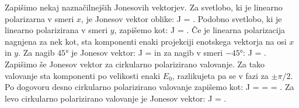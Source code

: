 Zapišimo nekaj naznačilnejših Jonesovih vektorjev. Za svetlobo, ki 
je linearno polarizarna v smeri $x$, je Jonesov vektor oblike:
\beq
J = \left[\begin{array}{c}
1\\
0\\
\end{array}\right]\!\!.
\label{eq:03_42}
\eeq
Podobno svetlobo, ki je linearno polarizirana v smeri $y$, zapišemo kot:
\beq
J = \left[\begin{array}{c}
0\\
1\\
\end{array}\right]\!\!.
\label{eq:03_43}
\eeq
Če je linearna polarizacija nagnjena za nek kot, sta komponenti enaki projekciji
enotskega vektorja na osi $x$ in $y$. Za nagib $45\si{\degree}$ je
Jonesov vektor:
\beq
J = \left[\begin{array}{c}
1\\
1\\
\end{array}\right]
\label{eq:03_44}
\eeq
in za nagib v smeri $-45\si{\degree}$:
\beq
J = \left[\begin{array}{c}
1\\
-1\\
\end{array}\right]\!\!.
\label{eq:03_45}
\eeq
Zapišimo še Jonesov vektor za cirkularno polarizirano
valovanje. Za tako valovanje sta komponenti po velikosti enaki $E_0$, 
razlikujeta pa se v fazi za $\pm \pi/2$. 
Po dogovoru desno cirkularno polarizirano valovanje zapišemo kot:
\beq
J = 
 = 
\left[\begin{array}{c}
1\\
e^{-i \pi/2}\\
\end{array}\right] =
\left[\begin{array}{c}
1\\
-i\\
\end{array}\right]\!\!.
\label{eq:03_46}
\eeq
Za levo cirkularno polarizirano valovanje je Jonesov
vektor:
\beq
J = 
\left[\begin{array}{c}
1\\
i\\
\end{array}\right]\!\!.
\label{eq:03_47}
\eeq

